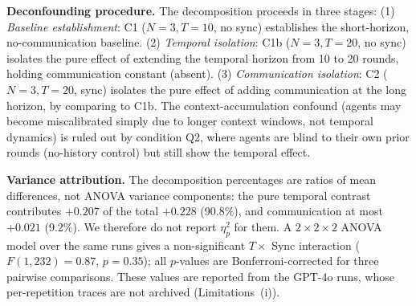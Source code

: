 \documentclass[11pt]{article}
\theoremstyle{definition}
\theoremstyle{remark}
\begin{document}
\textbf{Deconfounding procedure.} The decomposition proceeds in three stages: (1) \textit{Baseline establishment}: C1 ($N{=}3, T{=}10$, no sync) establishes the short-horizon, no-communication baseline. (2) \textit{Temporal isolation}: C1b ($N{=}3, T{=}20$, no sync) isolates the pure effect of extending the temporal horizon from 10 to 20 rounds, holding communication constant (absent). (3) \textit{Communication isolation}: C2 ($N{=}3, T{=}20$, sync) isolates the pure effect of adding communication at the long horizon, by comparing to C1b. The context-accumulation confound (agents may become miscalibrated simply due to longer context windows, not temporal dynamics) is ruled out by condition Q2, where agents are blind to their own prior rounds (no-history control) but still show the temporal effect.

\textbf{Variance attribution.} The decomposition percentages are ratios of mean differences, not ANOVA variance components: the pure temporal contrast contributes $+0.207$ of the total $+0.228$ (90.8\%), and communication at most $+0.021$ (9.2\%). We therefore do not report $\eta^2_p$ for them. A $2 \times 2 \times 2$ ANOVA model over the same runs gives a non-significant $T \times$ Sync interaction ($F(1,232) = 0.87$, $p = 0.35$); all $p$-values are Bonferroni-corrected for three pairwise comparisons. These values are reported from the GPT-4o runs, whose per-repetition traces are not archived (Limitations~(i)).
\end{document}
